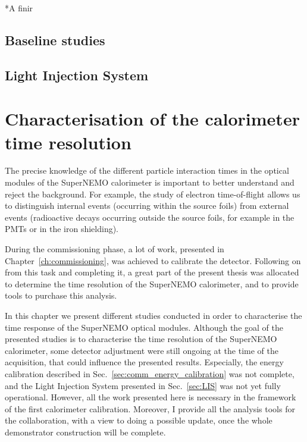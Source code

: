*A finir\\




\section{Baseline studies}
\label{sec:comm_baseline}

\section{Light Injection System}
\label{sec:LI}






\chapter{Characterisation of the calorimeter time resolution}

The precise knowledge of the different particle interaction times in the optical modules of the SuperNEMO calorimeter is important to better understand and reject the background.
For example, the study of electron time-of-flight allows us to distinguish internal events (occurring within the source foils) from external events (radioactive decays occurring outside the source foils, for example in the PMTs or in the iron shielding).

During the commissioning phase, a lot of work, presented in Chapter~\ref{ch:commissioning}, was achieved to calibrate the detector.
Following on from this task and completing it, a great part of the present thesis was allocated to determine the time resolution of the SuperNEMO calorimeter, and to provide tools to purchase this analysis.

In this chapter we present different studies conducted in order to characterise the time response of the SuperNEMO optical modules.
Although the goal of the presented studies is to characterise the time resolution of the SuperNEMO calorimeter, some detector adjustment were still ongoing at the time of the acquisition, that could influence the presented results.
Especially, the energy calibration described in Sec.~\ref{sec:comm_energy_calibration} was not complete, and the Light Injection System presented in Sec.~\ref{sec:LIS} was not yet fully operational.
However, all the work presented here is necessary in the framework of the first calorimeter calibration.
Moreover, I provide all the analysis tools for the collaboration, with a view to doing a possible update, once the whole demonstrator construction will be complete.

